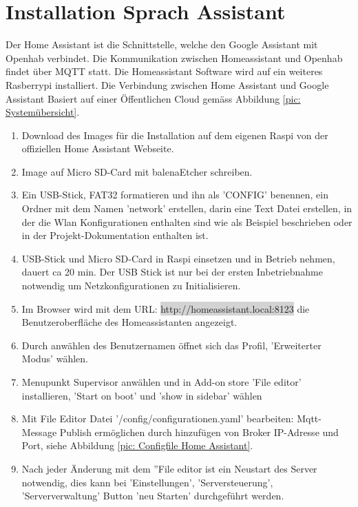 \clearpage
\section{Installation Sprach Assistant} \label{sec:Assistant}
Der Home Assistant ist die Schnittstelle, welche den Google Assistant mit Openhab verbindet. Die Kommunikation zwischen Homeassistant und Openhab findet über MQTT statt. Die Homeassistant Software wird auf ein weiteres Rasberrypi installiert. Die Verbindung zwischen Home Assistant und Google Assistant Basiert auf einer Öffentlichen Cloud gemäss Abbildung \ref{pic: Systemübersicht}.

\begin{enumerate}
	\item Download des Images für die Installation auf dem eigenen Raspi von der offiziellen Home Assistant \cite{assistant_installing_nodate} Webseite.
\item Image auf Micro SD-Card mit balenaEtcher \cite{noauthor_balenaetcher_nodate} schreiben. 
\item Ein USB-Stick, FAT32 formatieren und ihn als 'CONFIG' benennen, ein Ordner mit dem Namen 'network' erstellen, darin eine Text Datei erstellen, in der die Wlan Konfigurationen enthalten sind wie als Beispiel \cite{noauthor_home-assistantoperating-system_nodate} beschrieben oder in der Projekt-Dokumentation enthalten ist.
\item USB-Stick und Micro SD-Card in Raspi einsetzen und in Betrieb nehmen, dauert ca 20 min. Der USB Stick ist nur bei der ersten Inbetriebnahme notwendig um Netzkonfigurationen zu Initialisieren.
\item Im Browser wird mit dem URL: \colorbox{lightgray}{http://homeassistant.local:8123} die Benutzeroberfläche des Homeassistanten angezeigt. 
\item Durch anwählen des Benutzernamen öffnet sich das Profil, 'Erweiterter Modus' wählen.
\item Menupunkt Supervisor anwählen und in Add-on store 'File editor' installieren, 'Start on boot' und 'show in sidebar' wählen
\item Mit File Editor Datei '/config/configurationen.yaml' bearbeiten: Mqtt-Message Publish ermöglichen durch hinzufügen von Broker IP-Adresse und Port, siehe Abbildung \ref{pic: Configfile Home Assistant}.
\item Nach jeder Änderung mit dem ''File editor ist ein Neustart des Server notwendig, dies kann bei 'Einstellungen', 'Serversteuerung', 'Serververwaltung' Button 'neu Starten' durchgeführt werden.

\end{enumerate}
